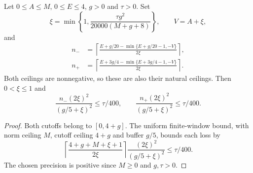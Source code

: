 \begin{lemma}
    \label{lem:alvv_soft_actual_window_losses}
    \leanok
    Let $0\le A\le M$, $0\le E\le4$, $g>0$ and $\tau>0$. Set
    \[
        \xi=\min\left\{1,\frac{\tau g^2}{20000(M+g+8)}\right\},
        \qquad V=A+\xi,
    \]
    and
    \begin{align}
        n_- & =\left\lceil\frac{E+g/20-\min\{E+g/20-1,-V\}}{2\xi}\right\rceil, \\
        n_+ & =\left\lceil\frac{E+3g/4-\min\{E+3g/4-1,-V\}}{2\xi}\right\rceil.
    \end{align}
    Both ceilings are nonnegative, so these are also their natural
    ceilings. Then $0<\xi\le1$ and
    \[
        \frac{n_-(2\xi)^2}{(g/5+\xi)^2}\le\tau/400,
        \qquad
        \frac{n_+(2\xi)^2}{(g/5+\xi)^2}\le\tau/400.
    \]
\end{lemma}
\begin{proof}\leanok
    Both cutoffs belong to $[0,4+g]$. The uniform finite-window bound,
    with norm ceiling $M$, cutoff ceiling $4+g$ and buffer $g/5$,
    bounds each loss by
    \[
        \left\lceil\frac{4+g+M+\xi+1}{2\xi}\right\rceil
        \frac{(2\xi)^2}{(g/5+\xi)^2}\le\tau/400.
    \]
    The chosen precision is positive since $M\ge0$ and $g,\tau>0$.
\end{proof}

